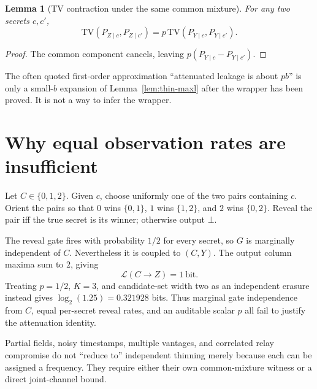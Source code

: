 \documentclass[11pt]{article}
\newtheorem{lemma}{Lemma}
\theoremstyle{definition}
\newcommand{\MaxL}{\mathcal{L}}
\newcommand{\TV}{\mathrm{TV}}
\begin{document}
\begin{lemma}[TV contraction under the same common mixture]\label{lem:thin-tv}
For any two secrets \(c,c'\),
\[
\TV(P_{Z\mid c},P_{Z\mid c'})=p\,\TV(P_{Y\mid c},P_{Y\mid c'}).
\]
\end{lemma}
\begin{proof}
The common component cancels, leaving \(p(P_{Y\mid c}-P_{Y\mid c'})\).
\end{proof}

The often quoted first-order approximation ``attenuated leakage is about \(pb\)'' is only a small-\(b\) expansion of Lemma~\ref{lem:thin-maxl} after the wrapper has been proved. It is not a way to infer the wrapper.

\section{Why equal observation rates are insufficient}\label{sec:counterexample}
Let \(C\in\{0,1,2\}\). Given \(c\), choose uniformly one of the two pairs containing \(c\). Orient the pairs so that \(0\) wins \(\{0,1\}\), \(1\) wins \(\{1,2\}\), and \(2\) wins \(\{0,2\}\). Reveal the pair iff the true secret is its winner; otherwise output \(\bot\).

The reveal gate fires with probability \(1/2\) for every secret, so \(G\) is marginally independent of \(C\). Nevertheless it is coupled to \((C,Y)\). The output column maxima sum to \(2\), giving
\[
\MaxL(C\to Z)=1\ \text{bit}.
\]
Treating \(p=1/2\), \(K=3\), and candidate-set width two as an independent erasure instead gives \(\log_2(1.25)=0.321928\) bits. Thus marginal gate independence from \(C\), equal per-secret reveal rates, and an auditable scalar \(p\) all fail to justify the attenuation identity.

Partial fields, noisy timestamps, multiple vantages, and correlated relay compromise do not ``reduce to'' independent thinning merely because each can be assigned a frequency. They require either their own common-mixture witness or a direct joint-channel bound.
\end{document}

